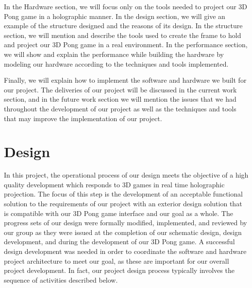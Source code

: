 \documentclass{sig-alternate}
\begin{document}
	In the Hardware section, we will focus only on the tools needed to project our 3D Pong game in a holographic manner. In the design section, we will give an example of the structure designed and the reasons of its design. In the structure section, we will mention and describe the tools used to create the frame to hold and project our 3D Pong game in a real environment.  In the performance section, we will show and explain the performance while building the hardware by modeling our hardware according to the techniques and tools implemented. 
	\newline
	 
	Finally, we will explain how to implement the software and hardware we built for our project. The deliveries of our project will be discussed in the current work section, and in the future work section we will mention the issues that we had throughout the development of our project as well as the techniques and tools that may improve the implementation of our project.  
	\newline
	
\section{Design}
\label{design considerations}
	In this project, the operational process of our design meets the objective of a high quality development which responds to 3D games in real time holographic projection. The focus of this step is the development of an acceptable functional solution to the requirements of our project with an exterior design solution that is compatible with our 3D Pong game interface and our goal as a whole. The progress sets of our design were formally modified, implemented, and reviewed by our group as they were issued at the completion of our schematic design, design development, and during the development of our 3D Pong game. A successful design development was needed in order to coordinate the software and hardware project architecture to meet our goal, as these are important for our overall project development. In fact, our project design process typically involves the sequence of activities described below.
\end{document}
